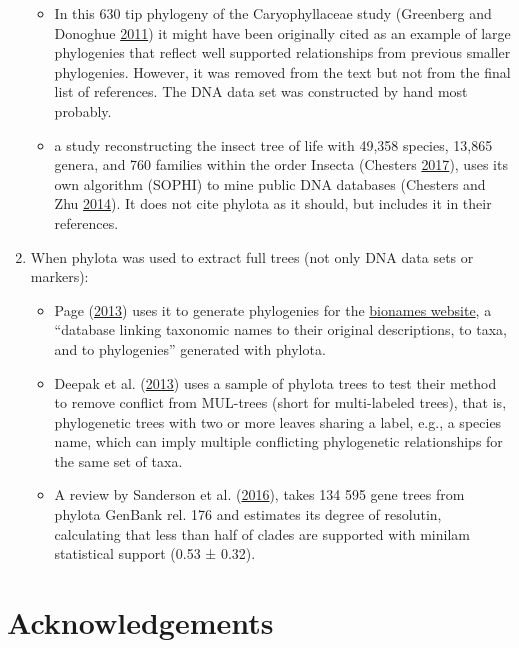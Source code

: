 \documentclass[]{article}
\providecommand{\tightlist}{%
  \setlength{\itemsep}{0pt}\setlength{\parskip}{0pt}}
\begin{document}
\begin{enumerate}
  \begin{itemize}
  \tightlist
  \item
    In this 630 tip phylogeny of the Caryophyllaceae study (Greenberg and Donoghue \protect\hyperlink{ref-greenberg2011caryophyllaceae}{2011}) it might have been originally
    cited as an example of large phylogenies that reflect well supported relationships
    from previous smaller phylogenies. However, it was removed from the text but
    not from the final list of references. The DNA data set was constructed by hand
    most probably.
  \item
    a study reconstructing the insect tree of life with 49,358 species, 13,865
    genera, and 760 families within the order Insecta (Chesters \protect\hyperlink{ref-chesters2017construction}{2017}),
    uses its own algorithm (SOPHI) to mine public DNA databases (Chesters and Zhu \protect\hyperlink{ref-chesters2014protocol}{2014}).
    It does not cite phylota as it should, but includes it in their references.
  \end{itemize}
\item
  When phylota was used to extract full trees (not only DNA data sets or markers):

  \begin{itemize}
  \tightlist
  \item
    Page (\protect\hyperlink{ref-page2013bionames}{2013}) uses it to generate phylogenies for the \href{http://bionames.org}{bionames website},
    a ``database linking taxonomic names to their original descriptions, to taxa, and
    to phylogenies'' generated with phylota.
  \item
    Deepak et al. (\protect\hyperlink{ref-deepak2013extracting}{2013}) uses a sample of phylota trees to test their method to
    remove conflict from MUL-trees (short for multi-labeled trees), that is, phylogenetic
    trees with two or more leaves sharing a label, e.g., a species name, which can
    imply multiple conflicting phylogenetic relationships for the same set of taxa.
  \item
    A review by Sanderson et al. (\protect\hyperlink{ref-sanderson2016perspective}{2016}), takes 134 595 gene trees from phylota
    GenBank rel. 176 and estimates its degree of resolutin, calculating that less
    than half of clades are supported with minilam statistical support (0.53 ± 0.32).
  \end{itemize}
\end{enumerate}

\hypertarget{acknowledgements}{%
\section{Acknowledgements}\label{acknowledgements}}
\end{document}
